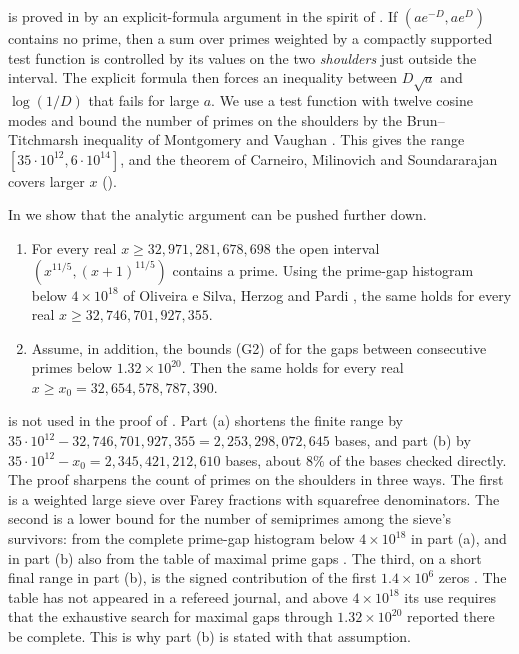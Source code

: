\documentclass[11pt,colorlinks]{charlie}
\newcommand{\xo}{x_0}
\begin{document}
 is proved in  by an explicit-formula argument in the spirit of \cite{CMS}. If $(ae^{-D},ae^{D})$ contains no prime, then a sum over primes weighted by a compactly supported test function is controlled by its values on the two \emph{shoulders} just outside the interval. The explicit formula then forces an inequality between $D\sqrt a$ and $\log(1/D)$ that fails for large $a$. We use a test function with twelve cosine modes and bound the number of primes on the shoulders by the Brun--Titchmarsh inequality of Montgomery and Vaughan \cite{MV}. This gives the range $[35\cdot10^{12},6\cdot10^{14}]$, and the theorem of Carneiro, Milinovich and Soundararajan covers larger $x$ ().

In  we show that the analytic argument can be pushed further down.

\begin{theorem}\label{thm:sharp}
\begin{enumerate}[label=(\alph*)]
\item For every real $x\ge32{,}971{,}281{,}678{,}698$ the open interval $(x^{11/5},(x+1)^{11/5})$ contains a prime. Using the prime-gap histogram below $4\times10^{18}$ of Oliveira e Silva, Herzog and Pardi \cite{OeSHP}, the same holds for every real $x\ge32{,}746{,}701{,}927{,}355$.
\item Assume, in addition, the bounds (G2) of  for the gaps between consecutive primes below $1.32\times10^{20}$. Then the same holds for every real $x\ge\xo=32{,}654{,}578{,}787{,}390$.
\end{enumerate}
\end{theorem}

 is not used in the proof of . Part (a) shortens the finite range by $35\cdot10^{12}-32{,}746{,}701{,}927{,}355=2{,}253{,}298{,}072{,}645$ bases, and part (b) by $35\cdot10^{12}-\xo=2{,}345{,}421{,}212{,}610$ bases, about $8\%$ of the bases checked directly. The proof sharpens the count of primes on the shoulders in three ways. The first is a weighted large sieve over Farey fractions with squarefree denominators. The second is a lower bound for the number of semiprimes among the sieve's survivors: from the complete prime-gap histogram below $4\times10^{18}$ \cite{OeSHP} in part (a), and in part (b) also from the table of maximal prime gaps \cite{RecordGaps}. The third, on a short final range in part (b), is the signed contribution of the first $1.4\times10^6$ zeros \cite{Platt,LMFDB}. The table \cite{RecordGaps} has not appeared in a refereed journal, and above $4\times10^{18}$ its use requires that the exhaustive search for maximal gaps through $1.32\times10^{20}$ reported there be complete. This is why part (b) is stated with that assumption.
\end{document}
